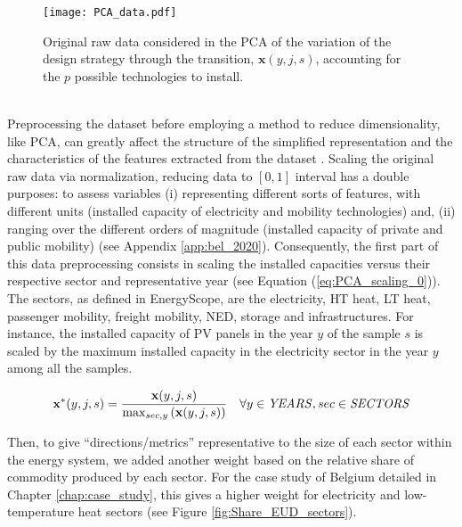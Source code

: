 \begin{figure}[!htbp]
\centering
\texttt{[image: PCA\_data.pdf]}
\caption{Original raw data considered in the \acrfull{PCA} of the variation of the design strategy through the transition, $\textbf{x}(y,j,s)$, accounting for the $p$ possible technologies to install.}
\label{fig:PCA_data}
\end{figure}

\\

\noindent
Preprocessing the dataset before employing a method to reduce dimensionality, like \gls{PCA}, can greatly affect the structure of the simplified representation and the characteristics of the features extracted from the dataset \cite{parente2013principal,peerenboom2015dimension}. Scaling the original raw data via normalization, \ie reducing data to $[0, 1]$ interval has a double purposes: to assess variables (i) representing different sorts of features, with different units (\eg installed capacity of electricity and mobility technologies) and, (ii) ranging over the different orders of magnitude (\eg installed capacity of private and public mobility) (see Appendix \ref{app:bel_2020}).  Consequently, the first part of this data preprocessing consists in scaling the installed capacities versus their respective sector and representative year (see Equation (\ref{eq:PCA_scaling_0})). The sectors, as defined in EnergyScope, are the electricity, \gls{HT} heat, \gls{LT} heat, passenger mobility, freight mobility, \gls{NED}, storage and infrastructures. For instance, the installed capacity of \gls{PV} panels in the year $y$ of the sample $s$ is scaled by the maximum installed capacity in the electricity sector in the year $y$ among all the samples.

\begin{equation}
 \label{eq:PCA_scaling_0}
\textbf{x}^{*}(y,j,s)=\frac{\textbf{x}(y,j,s)}{\mathrm{max}_{sec,y}\left(\textbf{x}(y,j,s)\right)}
 \quad \forall y \in \text{\emph{YEARS}}, sec \in \text{\emph{SECTORS}}
\end{equation}

Then, to give ``directions/metrics'' representative to the size of each sector within the energy system, we added another weight based on the relative share of commodity produced by each sector. For the case study of Belgium detailed in Chapter \ref{chap:case_study}, this gives a higher weight for electricity and low-temperature heat sectors (see Figure \ref{fig:Share_EUD_sectors}). 

